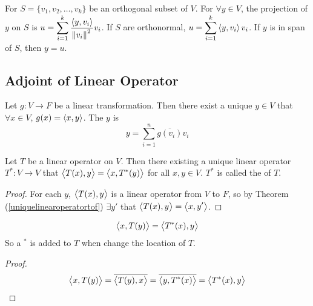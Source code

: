 \begin{theorem}
    For $S=\{v_1, v_2, \dots, v_k \}$ be an orthogonal subset of $V$. For $\forall y \in V$, the projection of $y$ on $S$ is $\displaystyle u = \sum_{i=1}^k \frac{\left\langle \displaystyle y, v_i \right\rangle}{\norm{v_i}^2} v_i$. If $S$ are orthonormal, $\displaystyle u = \sum_{i=1}^k \left\langle \displaystyle y, v_i \right\rangle v_i$. If $y$ is in span of $S$, then $y = u$.
\end{theorem}



\subsection{Adjoint of Linear Operator}

\begin{theorem}\label{uniquelinearoperatortof}
    Let $g: V \rightarrow F$ be a linear transformation. Then there exist a unique $y \in V$ that $\forall x \in V$, $g(x) = \left\langle \displaystyle x, y \right\rangle$. The $y$ is 
    \begin{equation}
        y = \sum_{i=1}^n \overline{g(v_i)} v_i
    \end{equation}
\end{theorem}

\begin{theorem}
    Let $T$ be a linear operator on $V$. Then there existing a unique linear operator $T^* : V \rightarrow V$ that $\left\langle \displaystyle T(x), y \right\rangle=\left\langle \displaystyle x, T^*(y) \right\rangle$ for all $x,y \in V$. $T^*$ is called the  of $T$.
\end{theorem}
\begin{proof}
    For each $y$, $\left\langle \displaystyle T(x), y \right\rangle$ is a linear operator from $V$ to $F$, so by Theorem (\ref{uniquelinearoperatortof}) $\exists y'$ that $\left\langle \displaystyle T(x), y \right\rangle = \left\langle \displaystyle x, y' \right\rangle$.
\end{proof}

\begin{theorem}
    \begin{equation}
        \left\langle \displaystyle x, T(y) \right\rangle = \left\langle \displaystyle T^*(x), y \right\rangle
    \end{equation}
    So a $^*$ is added to $T$ when change the location of $T$.
\end{theorem}
\begin{proof}
    \begin{equation*}
        \left\langle \displaystyle x, T(y) \right\rangle = \overline{\left\langle \displaystyle T(y), x \right\rangle} = \overline{\left\langle \displaystyle y, T^*(x) \right\rangle} = \left\langle \displaystyle T^*(x), y \right\rangle
    \end{equation*}
\end{proof}

